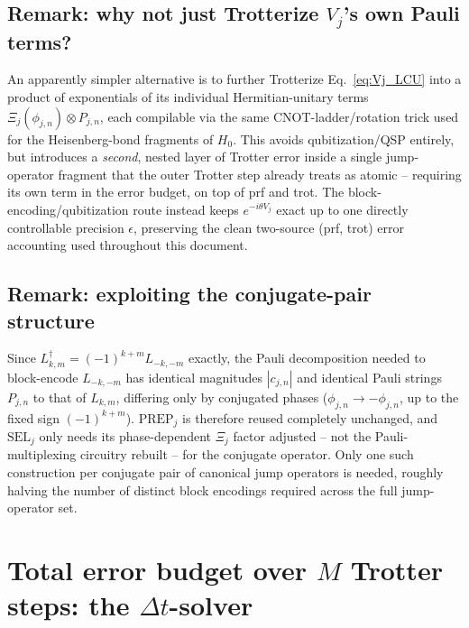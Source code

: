 \documentclass[11pt]{article}
\newcommand{\Dt}{\Delta t}
\newcommand{\Prep}{\mathrm{PREP}}
\newcommand{\Sel}{\mathrm{SEL}}
\begin{document}
\subsection{Remark: why not just Trotterize \texorpdfstring{$V_j$}{Vj}'s own Pauli terms?}
An apparently simpler alternative is to further Trotterize Eq.~\eqref{eq:Vj_LCU} into a product of exponentials of its individual Hermitian-unitary terms $\Xi_j(\phi_{j,n})\otimes P_{j,n}$, each compilable via the same CNOT-ladder/rotation trick used for the Heisenberg-bond fragments of $H_0$. This avoids qubitization/QSP entirely, but introduces a \emph{second}, nested layer of Trotter error inside a single jump-operator fragment that the outer Trotter step already treats as atomic -- requiring its own term in the error budget, on top of prf and trot. The block-encoding/qubitization route instead keeps $e^{-i\theta V_j}$ exact up to one directly controllable precision $\epsilon$, preserving the clean two-source (prf, trot) error accounting used throughout this document.

\subsection{Remark: exploiting the conjugate-pair structure}
Since $L_{k,m}^\dagger=(-1)^{k+m}L_{-k,-m}$ exactly, the Pauli decomposition needed to block-encode $L_{-k,-m}$ has identical magnitudes $|c_{j,n}|$ and identical Pauli strings $P_{j,n}$ to that of $L_{k,m}$, differing only by conjugated phases ($\phi_{j,n}\to-\phi_{j,n}$, up to the fixed sign $(-1)^{k+m}$). $\Prep_j$ is therefore reused completely unchanged, and $\Sel_j$ only needs its phase-dependent $\Xi_j$ factor adjusted -- not the Pauli-multiplexing circuitry rebuilt -- for the conjugate operator. Only one such construction per conjugate pair of canonical jump operators is needed, roughly halving the number of distinct block encodings required across the full jump-operator set.

\section{Total error budget over \texorpdfstring{$M$}{M} Trotter steps: the \texorpdfstring{$\Dt$}{Dt}-solver}
\label{sec:dt_solver}
\end{document}
